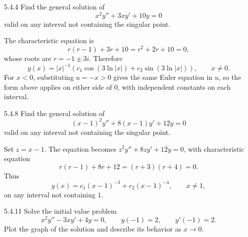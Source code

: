 \documentclass[11pt,oneside]{article}
\begin{document}
\begin{problem}{5.4.4}
Find the general solution of
\[
    x^2y''+3xy'+10y=0
\]
valid on any interval not containing the singular point.
\end{problem}

\begin{solution}
The characteristic equation is
\[
    r(r-1)+3r+10=r^2+2r+10=0,
\]
whose roots are $r=-1\pm3i$. Therefore
\[
    \boxed{y(x)=|x|^{-1}(c_1\cos(3\ln|x|)
          +c_2\sin(3\ln|x|))}, \qquad x\ne0.
\]
For $x<0$, substituting $u=-x>0$ gives the same Euler equation in $u$, so the form above applies on either side of $0$, with independent constants on each interval.
\end{solution}

\begin{problem}{5.4.8}
Find the general solution of
\[
    (x-1)^2y''+8(x-1)y'+12y=0
\]
valid on any interval not containing the singular point.
\end{problem}

\begin{solution}
Set $z=x-1$. The equation becomes $z^2y''+8zy'+12y=0$, with characteristic equation
\[
    r(r-1)+8r+12=(r+3)(r+4)=0.
\]
Thus
\[
    \boxed{y(x)=c_1(x-1)^{-3}+c_2(x-1)^{-4}}, \qquad x\ne1,
\]
on any interval not containing $1$.
\end{solution}

\begin{problem}{5.4.11}
Solve the initial value problem
\[
    x^2y''-3xy'+4y=0, \qquad y(-1)=2, \qquad y'(-1)=2.
\]
Plot the graph of the solution and describe its behavior as $x\to0$.
\end{problem}
\end{document}
